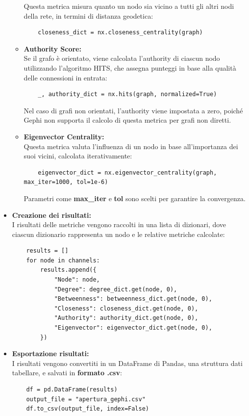 \documentclass[12pt]{article}
\begin{document}
\begin{itemize}[label=]
\begin{itemize}
			Questa metrica misura quanto un nodo sia vicino a tutti gli altri nodi della rete, in termini di distanza geodetica:
			\begin{lstlisting}
	closeness_dict = nx.closeness_centrality(graph)
			\end{lstlisting}
			\item \textbf{Authority Score:}\\
			Se il grafo è orientato, viene calcolata l'authority di ciascun nodo utilizzando l'algoritmo HITS, che assegna punteggi in base alla qualità delle connessioni in entrata:
			\begin{lstlisting}
	_, authority_dict = nx.hits(graph, normalized=True)
			\end{lstlisting}
			Nel caso di grafi non orientati, l’authority viene impostata a zero, poiché Gephi non supporta il calcolo di questa metrica per grafi non diretti.
			\item \textbf{Eigenvector Centrality:}\\
			Questa metrica valuta l’influenza di un nodo in base all’importanza dei suoi vicini, calcolata iterativamente:
			\begin{lstlisting}
	eigenvector_dict = nx.eigenvector_centrality(graph, max_iter=1000, tol=1e-6)
			\end{lstlisting}
			Parametri come \textbf{max\_iter} e \textbf{tol} sono scelti per garantire la convergenza.
		\end{itemize}
		\item \textbf{Creazione dei risultati:}\\
		I risultati delle metriche vengono raccolti in una lista di dizionari, dove ciascun dizionario rappresenta un nodo e le relative metriche calcolate:
		\begin{lstlisting}
	results = []
	for node in channels:
		results.append({
			"Node": node,
			"Degree": degree_dict.get(node, 0),
			"Betweenness": betweenness_dict.get(node, 0),
			"Closeness": closeness_dict.get(node, 0),
			"Authority": authority_dict.get(node, 0),
			"Eigenvector": eigenvector_dict.get(node, 0),
		})
		\end{lstlisting}
		\item \textbf{Esportazione risultati:}\\
		I risultati vengono convertiti in un DataFrame di Pandas, una struttura dati tabellare, e salvati in \textbf{formato .csv}:
		\begin{lstlisting}
	df = pd.DataFrame(results)
	output_file = "apertura_gephi.csv"
	df.to_csv(output_file, index=False)
		\end{lstlisting}
	\end{itemize}
\end{document}
